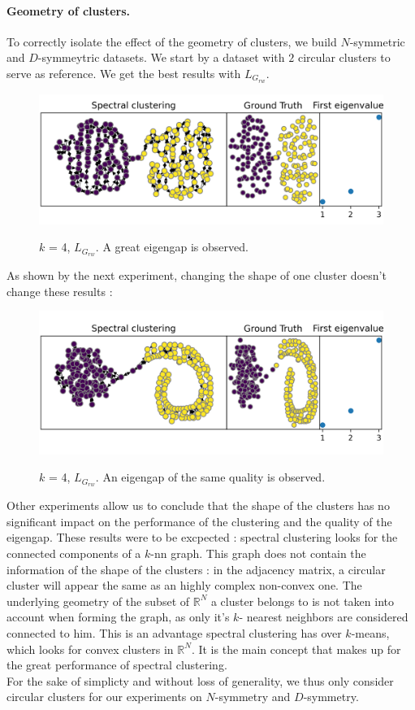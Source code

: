 \documentclass[a4paper,12pt]{article}
\theoremstyle{definition}
\theoremstyle{plain}
\def\R{\mathbb{R}}%
\begin{document}
\paragraph{Geometry of clusters.}
To correctly isolate the effect of the geometry of clusters, we build $N$-symmetric and $D$-symmeytric datasets. We start by a dataset with $2$ circular clusters to serve as reference.
We get the best results with $L_{G_{rw}}$.
\begin{figure}[H]
	\centering
	\includegraphics[width=0.6\linewidth]{figures/base_circles_g_rw}
	\label{fig:base_circles}
	\caption{$k$ = 4, $L_{G_{rw}}$. A great eigengap is observed.}
\end{figure}
As shown by the next experiment, changing the shape of one cluster doesn't change these results :
\begin{figure}[H]
	\centering
	\includegraphics[width=0.6\linewidth]{figures/uneven_blobs_g_rw}
	\label{fig:uneven_blobs}
	\caption{$k$ = 4, $L_{G_{rw}}$. An eigengap of the same quality is observed.}
\end{figure}

Other experiments allow us to conclude that the shape of the clusters has no significant impact on the performance of the clustering and the quality of the eigengap.
These results were to be excpected : spectral clustering looks for the connected components of a $k$-nn graph. This graph does not contain the information of the shape of the clusters : in the adjacency matrix, a circular cluster will appear the same as an highly complex non-convex one. The underlying geometry of the subset of $\R^N$ a cluster belongs to is not taken into account when forming the graph, as only it's $k$- nearest neighbors are considered connected to him. This is an advantage spectral clustering has over $k$-means, which looks for convex clusters in $\R^N$. It is the main concept that makes up for the great performance of spectral clustering. \\
For the sake of simplicty and without loss of generality, we thus only consider circular clusters for our experiments on $N$-symmetry and $D$-symmetry.
\end{document}
